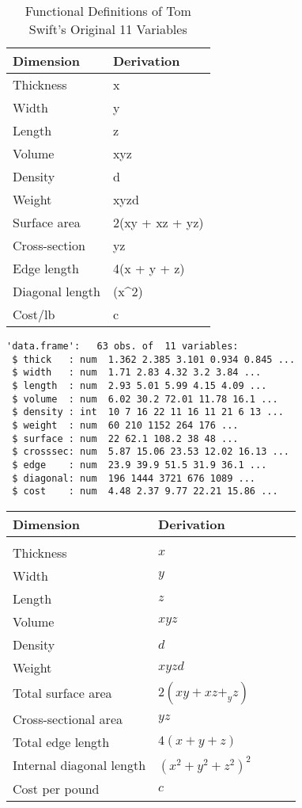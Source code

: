 \documentclass[
]{book}
\begin{document}
\begin{table}

\caption{\label{tab:unnamed-chunk-35}Functional Definitions of Tom Swift's Original 11 Variables}
\centering
\begin{tabular}[t]{l|l}
\hline
Dimension & Derivation\\
\hline
Thickness & x\\
\hline
Width & y\\
\hline
Length & z\\
\hline
Volume & xyz\\
\hline
Density & d\\
\hline
Weight & xyzd\\
\hline
Surface area & 2(xy + xz + yz)\\
\hline
Cross-section & yz\\
\hline
Edge length & 4(x + y + z)\\
\hline
Diagonal length & (x\textasciicircum{}2)\\
\hline
Cost/lb & c\\
\hline
\end{tabular}
\end{table}

\begin{verbatim}
'data.frame':   63 obs. of  11 variables:
 $ thick   : num  1.362 2.385 3.101 0.934 0.845 ...
 $ width   : num  1.71 2.83 4.32 3.2 3.84 ...
 $ length  : num  2.93 5.01 5.99 4.15 4.09 ...
 $ volume  : num  6.02 30.2 72.01 11.78 16.1 ...
 $ density : int  10 7 16 22 11 16 11 21 6 13 ...
 $ weight  : num  60 210 1152 264 176 ...
 $ surface : num  22 62.1 108.2 38 48 ...
 $ crosssec: num  5.87 15.06 23.53 12.02 16.13 ...
 $ edge    : num  23.9 39.9 51.5 31.9 36.1 ...
 $ diagonal: num  196 1444 3721 676 1089 ...
 $ cost    : num  4.48 2.37 9.77 22.21 15.86 ...
\end{verbatim}

\begin{table}[]
\begin{tabular}{lllll}
 Dimension &  Derivation  &  \\
 \hline \\
 Thickness &  $x$  \\
 Width & $y$ \\
 Length & $z$ \\
 Volume & $xyz$ \\
 Density & $d$ \\
 Weight & $xyzd$ \\
 Total surface area & $2(xy + xz +_ yz)$ \\
 Cross-sectional area & $yz$ \\
 Total edge length & $4(x +  y + z)$ \\
 Internal diagonal length & $(x^2 + y^2 + z^2)^2$ \\
 Cost per pound & $c$
\end{tabular}
\end{table}
\end{document}
